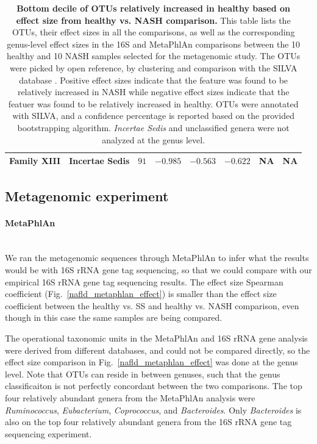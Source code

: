 \begin{table}[!ht]
\begin{tiny}
\begin{tabular}{|l|l|l|l|l|l|l|l|}
Family XIII & Incertae Sedis & $91$ & $-0.985$ & $-0.563$ & $-0.622$ & NA & NA \\ \hline
\end{tabular}
\end{tiny}
\caption{ \textbf{Bottom decile of OTUs relatively increased in healthy based on effect size from healthy vs. NASH comparison.} This table lists the OTUs, their effect sizes in all the comparisons, as well as the corresponding genus-level effect sizes in the 16S and MetaPhlAn comparisons between the 10 healthy and 10 NASH samples selected for the metagenomic study. The OTUs were picked by open reference, by clustering and comparison with the SILVA database \cite{quast2013silva}. Positive effect sizes indicate that the feature was found to be relatively increased in NASH while negative effect sizes indicate that the featuer was found to be relatively increased in healthy. OTUs were annotated with SILVA, and a confidence percentage is reported based on the provided bootstrapping algorithm. \textit{Incertae Sedis} and unclassified genera were not analyzed at the genus level.}
\label{nafld_bot_otu_table}
\end{table}


\FloatBarrier

\subsection{Metagenomic experiment}

\paragraph{MetaPhlAn}\mbox{}\\

We ran the metagenomic sequences through MetaPhlAn to infer what the results would be with 16S rRNA gene tag sequencing, so that we could compare with our empirical 16S rRNA gene tag sequencing results. The effect size Spearman coefficient (Fig.~\ref{nafld_metaphlan_effect}) is smaller than the effect size coefficient between the healthy vs. SS and healthy vs. NASH comparison, even though in this case the same samples are being compared.

The operational taxonomic units in the MetaPhlAn and 16S rRNA gene analysis were derived from different databases, and could not be compared directly, so the effect size comparison in Fig.~\ref{nafld_metaphlan_effect} was done at the genus level. Note that OTUs can reside in between genuses, such that the genus classificaiton is not perfectly concordant between the two comparisons. The top four relatively abundant genera from the MetaPhlAn analysis were \textit{Ruminococcus}, \textit{Eubacterium}, \textit{Coprococcus}, and \textit{Bacteroides}. Only \textit{Bacteroides} is also on the top four relatively abundant genera from the 16S rRNA gene tag sequencing experiment.

